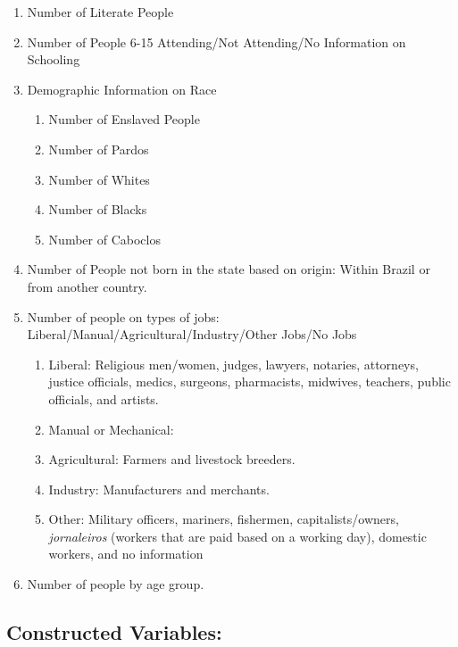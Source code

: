 \documentclass{article}
\begin{document}
\begin{enumerate}
  \item Number of Literate People
  \item Number of People 6-15 Attending/Not Attending/No Information on Schooling
  \item Demographic Information on Race
    \begin{enumerate}
      \item Number of Enslaved People
      \item Number of Pardos
      \item Number of Whites
      \item Number of Blacks
      \item Number of Caboclos
    \end{enumerate}
  \item Number of People not born in the state based on origin: Within Brazil or from another country.
  \item Number of people on types of jobs: Liberal/Manual/Agricultural/Industry/Other Jobs/No Jobs
    \begin{enumerate}
      \item Liberal: Religious men/women, judges, lawyers, notaries, attorneys, justice officials, medics, surgeons, pharmacists, midwives, teachers, public officials, and artists.
      \item Manual or Mechanical: 
      \item Agricultural: Farmers and livestock breeders.
      \item Industry: Manufacturers and merchants.
      \item Other: Military officers, mariners, fishermen, capitalists/owners, \textit{jornaleiros} (workers that are paid based on a working day), domestic workers, and no information
    \end{enumerate}
  \item Number of people by age group.
\end{enumerate}

\subsection{Constructed Variables:}
\end{document}
